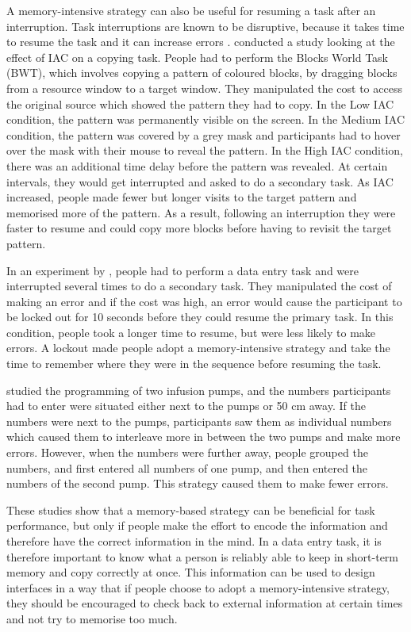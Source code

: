 A memory-intensive strategy can also be useful for resuming a task after an interruption. Task interruptions are known to be disruptive, because it takes time to resume the task and it can increase errors \citep{Back2010, Brumby2013, Morgan2009}. 
\citet{Morgan2009} conducted a study looking at the effect of IAC on a copying task. People had to perform the Blocks World Task (BWT), which involves copying a pattern of coloured blocks, by dragging blocks from a resource window to a target window. They manipulated the cost to access the original source which showed the pattern they had to copy. In the Low IAC condition, the pattern was permanently visible on the screen. In the Medium IAC condition, the pattern was covered by a grey mask and participants had to hover over the mask with their mouse to reveal the pattern. In the High IAC condition, there was an additional time delay before the pattern was revealed. At certain intervals, they would get interrupted and asked to do a secondary task. As IAC increased, people made fewer but longer visits to the target pattern and memorised more of the pattern. As a result, following an interruption they were faster to resume and could copy more blocks before having to revisit the target pattern. 

In an experiment by \citet{Brumby2013}, people had to perform a data entry task and were interrupted several times to do a secondary task. They manipulated the cost of making an error and if the cost was high, an error would cause the participant to be locked out for 10 seconds before they could resume the primary task. In this condition, people took a longer time to resume, but were less likely to make errors. A lockout made people adopt a memory-intensive strategy and take the time to remember where they were in the sequence before resuming the task. 

\citet{Back2012} studied the programming of two infusion pumps, and the numbers participants had to enter were situated either next to the pumps or 50 cm away. If the numbers were next to the pumps, participants saw them as individual numbers which caused them to interleave more in between the two pumps and make more errors. 
However, when the numbers were further away, people grouped the numbers, and first entered all numbers of one pump, and then entered the numbers of the second pump. This strategy caused them to make fewer errors. 

These studies show that a memory-based strategy can be beneficial for task performance, but only if people make the effort to encode the information and therefore have the correct information in the mind. In a data entry task, it is therefore important to know what a person is reliably able to keep in short-term memory and copy correctly at once. This information can be used to design interfaces in a way that if people choose to adopt a memory-intensive strategy, they should be encouraged to check back to external information at certain times and not try to memorise too much.

